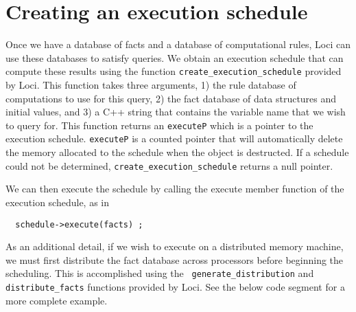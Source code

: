 \documentclass[10pt,epsf]{book}
\begin{document}
\section{Creating an execution schedule}

Once we have a database of facts and a database of computational
rules, Loci can use these databases to satisfy queries.  We obtain an
execution schedule that can compute these results using the function
{\tt create\_execution\_schedule} provided by Loci.  This function
takes three arguments, 1) the rule database of computations to use for
this query, 2) the fact database of data structures and initial
values, and 3) a C++ string that contains the variable name that we
wish to query for.  This function returns an {\tt executeP} which is a
pointer to the execution schedule.  {\tt executeP} is a counted
pointer that will automatically delete the memory allocated to the
schedule when the object is destructed.  If a schedule could not be
determined, {\tt create\_execution\_schedule} returns a null pointer.  

We can then execute the schedule by calling the execute member
function of the execution schedule, as in
\begin{verbatim}
  schedule->execute(facts) ;
\end{verbatim}

As an additional detail, if we wish to execute on a distributed memory
machine, we must first distribute the fact database across processors
before beginning the scheduling.  This is accomplished using the {\tt
  generate\_distribution} and {\tt distribute\_facts} functions
provided by Loci.  See the below code segment for a more complete
example.
\end{document}
